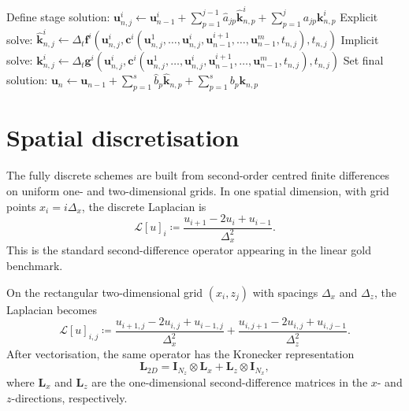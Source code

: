 \begin{algorithm}[H]
    \caption{IMEX-RK partitioned multiphysics scheme: strong Gauss-Seidel predictor \cite{Huang_2019}}
    \label{alg:ch2-strong_GS}
    \begin{algorithmic}[1]
        \State Define stage solution: $\boldsymbol{u}_{n,j}^i \gets \boldsymbol{u}_{n-1}^i + \sum_{p=1}^{j-1} \hat{a}_{jp} \hat{\boldsymbol{k}}_{n,p}^i + \sum_{p=1}^{j} a_{jp} \boldsymbol{k}_{n,p}^i$
        \State Explicit solve: $\hat{\boldsymbol{k}}_{n,j}^i \gets \Delta_t \boldsymbol{f}^i(\boldsymbol{u}_{n,j}^i, \boldsymbol{c}^i(\boldsymbol{u}_{n,j}^1, \dots, \boldsymbol{u}_{n,j}^i, \boldsymbol{u}_{n-1}^{i+1}, \dots, \boldsymbol{u}_{n-1}^m, t_{n,j}), t_{n,j})$
        \State Implicit solve: $\boldsymbol{k}_{n,j}^i \gets \Delta_t \boldsymbol{g}^i(\boldsymbol{u}_{n,j}^i, \boldsymbol{c}^i(\boldsymbol{u}_{n,j}^1, \dots, \boldsymbol{u}_{n,j}^i, \boldsymbol{u}_{n-1}^{i+1}, \dots, \boldsymbol{u}_{n-1}^m, t_{n,j}), t_{n,j})$
        \EndFor
        \EndFor
        \State Set final solution: $\boldsymbol{u}_n \gets \boldsymbol{u}_{n-1} + \sum_{p=1}^{s} \hat{b}_p \hat{\boldsymbol{k}}_{n,p} + \sum_{p=1}^{s} b_p \boldsymbol{k}_{n,p}$
    \end{algorithmic}
\end{algorithm}

\section{Spatial discretisation}
\label{sec:ch2-spatial}

The fully discrete schemes are built from second-order centred finite differences on uniform one- and two-dimensional grids. In one spatial dimension, with grid points $x_i=i\Delta_x$, the discrete Laplacian is
\begin{equation}
    \mathcal{L}[u]_i \coloneqq \frac{u_{i+1} - 2u_i + u_{i-1}}{\Delta_x^2}.
    \label{eq:ch2-laplacian-1d}
\end{equation}
This is the standard second-difference operator appearing in the linear gold benchmark.

On the rectangular two-dimensional grid $(x_i,z_j)$ with spacings $\Delta_x$ and $\Delta_z$, the Laplacian becomes
\begin{equation}
    \mathcal{L}[u]_{i,j}
    \coloneqq
    \frac{u_{i+1,j} - 2u_{i,j} + u_{i-1,j}}{\Delta_x^2}
    +
    \frac{u_{i,j+1} - 2u_{i,j} + u_{i,j-1}}{\Delta_z^2}.
    \label{eq:ch2-laplacian-2d}
\end{equation}
After vectorisation, the same operator has the Kronecker representation
\[
    \mathbf{L}_{2D}
    =
    \mathbf{I}_{N_z} \otimes \mathbf{L}_x
    +
    \mathbf{L}_z \otimes \mathbf{I}_{N_x},
\]
where $\mathbf{L}_x$ and $\mathbf{L}_z$ are the one-dimensional second-difference matrices in the $x$- and $z$-directions, respectively.

